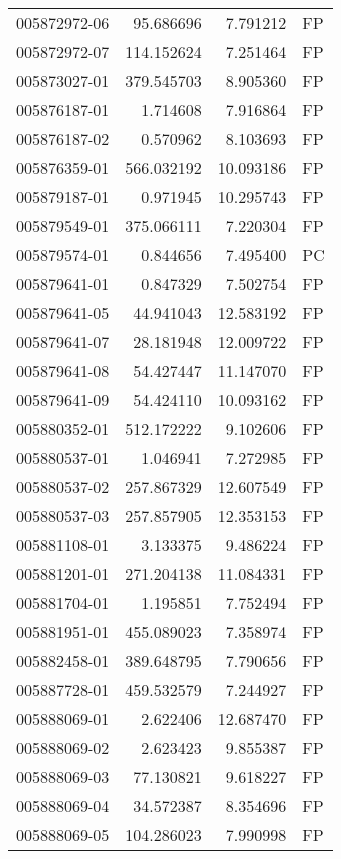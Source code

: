 \begin{tabular}{lrrl}
005872972-06 &   95.686696 &     7.791212 &   FP \\
005872972-07 &  114.152624 &     7.251464 &   FP \\
005873027-01 &  379.545703 &     8.905360 &   FP \\
005876187-01 &    1.714608 &     7.916864 &   FP \\
005876187-02 &    0.570962 &     8.103693 &   FP \\
005876359-01 &  566.032192 &    10.093186 &   FP \\
005879187-01 &    0.971945 &    10.295743 &   FP \\
005879549-01 &  375.066111 &     7.220304 &   FP \\
005879574-01 &    0.844656 &     7.495400 &   PC \\
005879641-01 &    0.847329 &     7.502754 &   FP \\
005879641-05 &   44.941043 &    12.583192 &   FP \\
005879641-07 &   28.181948 &    12.009722 &   FP \\
005879641-08 &   54.427447 &    11.147070 &   FP \\
005879641-09 &   54.424110 &    10.093162 &   FP \\
005880352-01 &  512.172222 &     9.102606 &   FP \\
005880537-01 &    1.046941 &     7.272985 &   FP \\
005880537-02 &  257.867329 &    12.607549 &   FP \\
005880537-03 &  257.857905 &    12.353153 &   FP \\
005881108-01 &    3.133375 &     9.486224 &   FP \\
005881201-01 &  271.204138 &    11.084331 &   FP \\
005881704-01 &    1.195851 &     7.752494 &   FP \\
005881951-01 &  455.089023 &     7.358974 &   FP \\
005882458-01 &  389.648795 &     7.790656 &   FP \\
005887728-01 &  459.532579 &     7.244927 &   FP \\
005888069-01 &    2.622406 &    12.687470 &   FP \\
005888069-02 &    2.623423 &     9.855387 &   FP \\
005888069-03 &   77.130821 &     9.618227 &   FP \\
005888069-04 &   34.572387 &     8.354696 &   FP \\
005888069-05 &  104.286023 &     7.990998 &   FP \\

\end{tabular}
